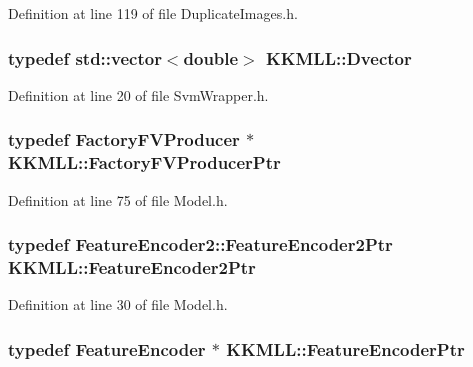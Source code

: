 Definition at line 119 of file Duplicate\+Images.\+h.

\subsubsection[{\texorpdfstring{Dvector}{Dvector}}]{\setlength{\rightskip}{0pt plus 5cm}typedef std\+::vector$<$double$>$ {\bf K\+K\+M\+L\+L\+::\+Dvector}}\hypertarget{namespace_k_k_m_l_l_a4cdbae7e3075ec073ae28b98c8017a2c}{}\label{namespace_k_k_m_l_l_a4cdbae7e3075ec073ae28b98c8017a2c}


Definition at line 20 of file Svm\+Wrapper.\+h.

\subsubsection[{\texorpdfstring{Factory\+F\+V\+Producer\+Ptr}{FactoryFVProducerPtr}}]{\setlength{\rightskip}{0pt plus 5cm}typedef {\bf Factory\+F\+V\+Producer} $\ast$ {\bf K\+K\+M\+L\+L\+::\+Factory\+F\+V\+Producer\+Ptr}}\hypertarget{namespace_k_k_m_l_l_a82812d1feb85a6cff72d059bc67bb90e}{}\label{namespace_k_k_m_l_l_a82812d1feb85a6cff72d059bc67bb90e}


Definition at line 75 of file Model.\+h.

\subsubsection[{\texorpdfstring{Feature\+Encoder2\+Ptr}{FeatureEncoder2Ptr}}]{\setlength{\rightskip}{0pt plus 5cm}typedef {\bf Feature\+Encoder2\+::\+Feature\+Encoder2\+Ptr} {\bf K\+K\+M\+L\+L\+::\+Feature\+Encoder2\+Ptr}}\hypertarget{namespace_k_k_m_l_l_a1f6189100c36e1d399f2155020fcfc8a}{}\label{namespace_k_k_m_l_l_a1f6189100c36e1d399f2155020fcfc8a}


Definition at line 30 of file Model.\+h.

\subsubsection[{\texorpdfstring{Feature\+Encoder\+Ptr}{FeatureEncoderPtr}}]{\setlength{\rightskip}{0pt plus 5cm}typedef {\bf Feature\+Encoder} $\ast$ {\bf K\+K\+M\+L\+L\+::\+Feature\+Encoder\+Ptr}}\hypertarget{namespace_k_k_m_l_l_a72cdf9beec1c671ef814e86c1df34874}{}\label{namespace_k_k_m_l_l_a72cdf9beec1c671ef814e86c1df34874}


